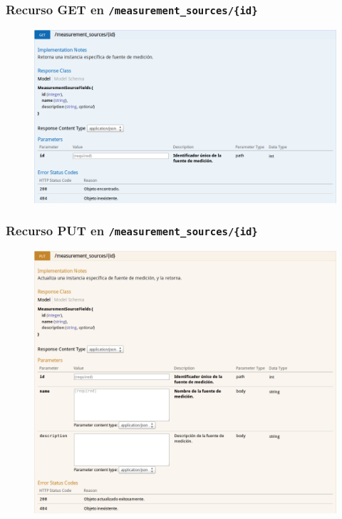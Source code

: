 \newpage


\subsubsection{Recurso GET en \texttt{/measurement\_sources/\{id\}}}

\begin{figure}[h]
  \centering
  \includegraphics[width=\textwidth,height=.75\textheight,keepaspectratio]{img/especificacion_api/measurementSourceView_get}
  \label{measurementSourceView_get}
\end{figure}

\newpage


\subsubsection{Recurso PUT en \texttt{/measurement\_sources/\{id\}}}

\begin{figure}[h]
  \centering
  \includegraphics[width=\textwidth,height=.75\textheight,keepaspectratio]{img/especificacion_api/measurementSourceView_put}
  \label{measurementSourceView_put}
\end{figure}

